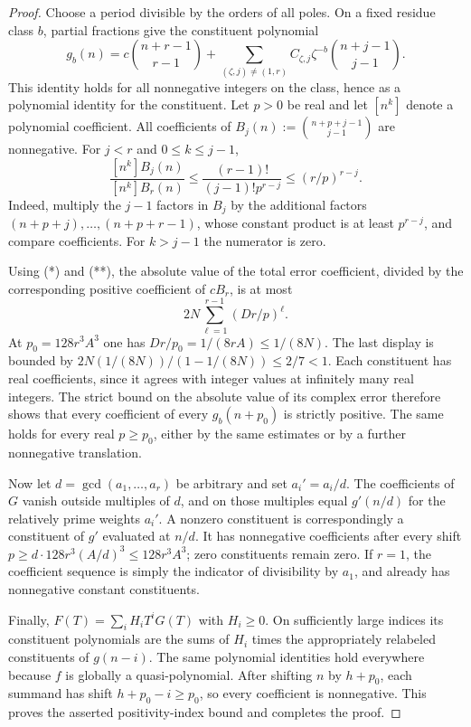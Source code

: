 \documentclass[11pt,a4paper]{article}
\begin{document}
\begin{proof}
Choose a period divisible by the orders of all poles. On a fixed residue
class $b$, partial fractions give the constituent polynomial
\[
 g_b(n)=c\binom{n+r-1}{r-1}
 +\sum_{(\zeta,j)\ne(1,r)}
     C_{\zeta,j}\zeta^{-b}\binom{n+j-1}{j-1}.
\]
This identity holds for all nonnegative integers on the class, hence as
a polynomial identity for the constituent. Let $p>0$ be real and let
$[n^k]$ denote a polynomial coefficient. All coefficients of
$B_j(n):=\binom{n+p+j-1}{j-1}$ are nonnegative. For $j<r$ and
$0\le k\le j-1$,
\[
 \frac{[n^k]B_j(n)}{[n^k]B_r(n)}
 \le \frac{(r-1)!}{(j-1)!p^{r-j}}
 \le (r/p)^{r-j}.                              \tag{**}
\]
Indeed, multiply the $j-1$ factors in $B_j$ by the additional factors
$(n+p+j),\ldots,(n+p+r-1)$, whose constant product is at least
$p^{r-j}$, and compare coefficients. For $k>j-1$ the numerator is zero.

Using (*) and (**), the absolute value of the total error coefficient,
divided by the corresponding positive coefficient of $cB_r$, is at most
\[
 2N\sum_{\ell=1}^{r-1}(Dr/p)^\ell.
\]
At $p_0=128r^3A^3$ one has $Dr/p_0=1/(8rA)\le1/(8N)$.
The last display is bounded by
$2N(1/(8N))/(1-1/(8N))\le2/7<1$.
Each constituent has real coefficients, since it agrees with integer
values at infinitely many real integers. The strict bound on the
absolute value of its complex error therefore shows that every
coefficient of every $g_b(n+p_0)$ is strictly positive.
The same holds for every real $p\ge p_0$, either by the same estimates
or by a further nonnegative translation.

Now let $d=\gcd(a_1,\ldots,a_r)$ be arbitrary and set $a_i'=a_i/d$.
The coefficients of $G$ vanish outside multiples of $d$, and on those
multiples equal $g'(n/d)$ for the relatively prime weights $a_i'$.
A nonzero constituent is correspondingly a constituent of $g'$ evaluated
at $n/d$. It has nonnegative coefficients after every shift
$p\ge d\cdot128r^3(A/d)^3\le128r^3A^3$; zero constituents remain zero.
If $r=1$, the coefficient sequence is simply the indicator of divisibility
by $a_1$, and already has nonnegative constant constituents.

Finally, $F(T)=\sum_i H_iT^iG(T)$ with $H_i\ge0$.
On sufficiently large indices its constituent polynomials are the sums
of $H_i$ times the appropriately relabeled constituents of $g(n-i)$.
The same polynomial identities hold everywhere because $f$ is globally
a quasi-polynomial. After shifting $n$ by $h+p_0$, each summand has
shift $h+p_0-i\ge p_0$, so every coefficient is nonnegative.
This proves the asserted positivity-index bound and completes the proof.
\end{proof}
\end{document}
